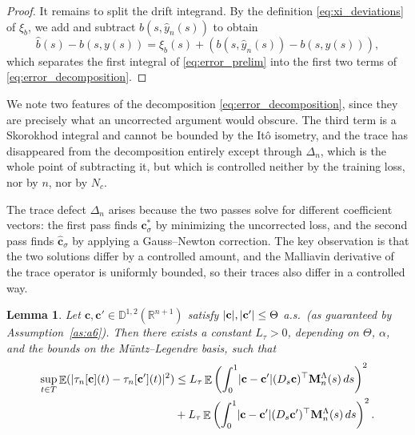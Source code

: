 \documentclass[11pt, a4paper]{article}
\theoremstyle{theoremstyle}
\newtheorem{lemma}[theorem]{Lemma}
\theoremstyle{definitionstyle}
\newcommand{\dd}{\mathop{}\!d}
\DeclareMathOperator{\EE}{\mathbb E}
\DeclarePairedDelimiter{\abs}{\lvert}{\rvert}
\begin{document}
\begin{proof}
    It remains to split the drift integrand. By the definition \eqref{eq:xi_deviations} of $\xi_b$, we add and subtract $b(s, \hat y_n(s))$ to obtain
    \begin{equation}
        \hat b(s) - b(s, y(s)) = \xi_b(s) + \left ( b(s, \hat y_n(s)) - b(s, y(s)) \right ),
    \end{equation}
    which separates the first integral of \eqref{eq:error_prelim} into the first two terms of \eqref{eq:error_decomposition}.
\end{proof}

We note two features of the decomposition \eqref{eq:error_decomposition}, since they are precisely what an uncorrected argument would obscure. The third term is a Skorokhod integral and cannot be bounded by the It\^o isometry, and the trace has disappeared from the decomposition entirely except through $\Delta_n$, which is the whole point of subtracting it, but which is controlled neither by the training loss, nor by $n$, nor by $N_c$.

The trace defect $\Delta_n$ arises because the two passes solve for different coefficient vectors: the first pass finds $\mathbf c^*_\sigma$ by minimizing the uncorrected loss, and the second pass finds $\hat{\mathbf c}_\sigma$ by applying a Gauss--Newton correction. The key observation is that the two solutions differ by a controlled amount, and the Malliavin derivative of the trace operator is uniformly bounded, so their traces also differ in a controlled way.

\begin{lemma}\label{lem:trace_lipschitz}
    Let $\mathbf c, \mathbf c' \in \mathbb D^{1,2}(\mathbb R^{n+1})$ satisfy $\abs{\mathbf c}, \abs{\mathbf c'} \leq \Theta$ a.s.\ (as guaranteed by Assumption~\ref{as:a6}). Then there exists a constant $L_\tau > 0$, depending on $\Theta$, $\alpha$, and the bounds on the Müntz--Legendre basis, such that
    \begin{equation}\label{eq:trace_lipschitz}
    \begin{aligned}
        \sup_{t \in T} \EE(\abs{\tau_n[\mathbf c](t) - \tau_n[\mathbf c'](t)}^2) &\leq L_\tau \EE \left ( \int_0^1 \abs{\mathbf c - \mathbf c'} (D_s \mathbf c)^\top \mathbf M_n^\Lambda(s) \dd{s} \right )^2  \\
        &+ L_\tau \EE \left ( \int_0^1 \abs{\mathbf c - \mathbf c'} (D_s \mathbf c')^\top \mathbf M_n^\Lambda(s) \dd{s} \right )^2.
    \end{aligned}
    \end{equation}
\end{lemma}
\end{document}
